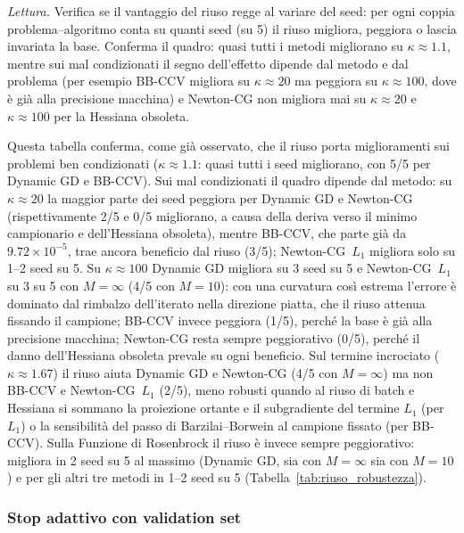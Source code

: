 \documentclass[a4paper,12pt]{article}
\numberwithin{equation}{section}
\numberwithin{figure}{section}
\numberwithin{table}{section}
\begin{document}
\noindent\emph{Lettura.} Verifica se il vantaggio del riuso regge al variare del seed: per ogni coppia problema--algoritmo conta su quanti seed (su 5) il riuso migliora, peggiora o lascia invariata la base. Conferma il quadro: quasi tutti i metodi migliorano su $\kappa\approx1.1$, mentre sui mal condizionati il segno dell'effetto dipende dal metodo e dal problema (per esempio BB-CCV migliora su $\kappa\approx20$ ma peggiora su $\kappa\approx100$, dove è già alla precisione macchina) e Newton-CG non migliora mai su $\kappa\approx20$ e $\kappa\approx100$ per la Hessiana obsoleta.

Questa tabella conferma, come già osservato, che il riuso porta
miglioramenti sui problemi ben condizionati ($\kappa\approx1.1$: quasi tutti
i seed migliorano, con 5/5 per Dynamic GD e BB-CCV). Sui mal condizionati il
quadro dipende dal metodo: su $\kappa\approx20$ la maggior parte dei seed
peggiora per Dynamic GD e Newton-CG (rispettivamente 2/5 e 0/5 migliorano, a
causa della deriva verso il minimo campionario e dell'Hessiana obsoleta),
mentre BB-CCV, che parte già da $9.72\times10^{-5}$, trae ancora beneficio
dal riuso (3/5); Newton-CG~$L_1$ migliora solo su 1--2 seed su 5. Su
$\kappa\approx100$ Dynamic GD migliora su 3 seed su 5 e Newton-CG~$L_1$ su 3
su 5 con $M{=}\infty$ (4/5 con $M{=}10$): con una curvatura così estrema
l'errore è dominato dal rimbalzo dell'iterato nella direzione piatta, che il
riuso attenua fissando il campione; BB-CCV invece peggiora (1/5), perché la
base è già alla precisione macchina; Newton-CG resta sempre peggiorativo
(0/5), perché il danno dell'Hessiana obsoleta prevale su ogni beneficio. Sul
termine incrociato ($\kappa\approx1.67$) il riuso aiuta Dynamic GD e
Newton-CG (4/5 con $M{=}\infty$) ma non BB-CCV e Newton-CG~$L_1$ (2/5), meno
robusti quando al riuso di batch e Hessiana si sommano la proiezione ortante
e il subgradiente del termine $L_1$ (per $L_1$) o la sensibilità del passo di
Barzilai--Borwein al campione fissato (per BB-CCV). Sulla Funzione di Rosenbrock
il riuso è invece sempre peggiorativo: migliora in 2 seed su 5 al massimo
(Dynamic GD, sia con $M=\infty$ sia con $M=10$) e per gli altri tre metodi in
1--2 seed su 5 (Tabella~\ref{tab:riuso_robustezza}).


\subsubsection{Stop adattivo con validation set}\label{app:riuso-validation}
\end{document}

